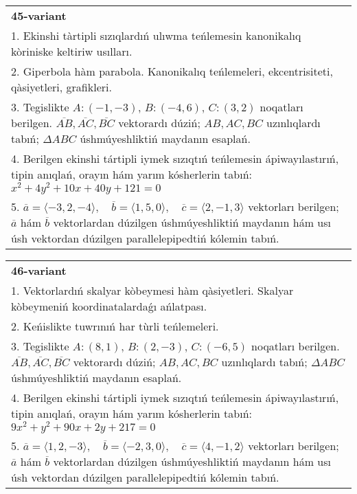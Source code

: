 \documentclass{article}
\begin{document}
\begin{tabular}{m{17cm}}
\textbf{45-variant}\\
1. Ekinshi tàrtipli sızıqlardıń ulıwma teńlemesin kanonikalıq kòriniske keltiriw usılları.\\

2. Giperbola hàm parabola. Kanonikalıq teńlemeleri, ekcentrisiteti, qàsiyetleri, grafikleri.\\

3. Tegislikte $A: (-1, -3)$, $B: (-4, 6)$, $C: (3, 2)$ noqatları berilgen. $\overline{AB}, \overline{AC}, \overline{BC}$ vektorardı dúziń; $AB, AC, BC$ uzınlıqlardı tabıń; $\Delta ABC$ úshmúyeshliktiń maydanın esaplań. \\

4. Berilgen ekinshi tártipli iymek sızıqtıń teńlemesin ápiwayılastırıń, tipin anıqlań, orayın hám yarım kósherlerin tabıń: $x^2+4y^2+10x+40y+121=0$\\

5. \(\overline{a} = \langle -3, 2, -4 \rangle, \quad \overline{b} = \langle 1, 5, 0 \rangle, \quad \overline{c} = \langle 2, -1, 3 \rangle\) vektorları berilgen; \(\overline{a}\) hám \(\overline{b}\) vektorlardan dúzilgen úshmúyeshliktiń maydanın hám usı úsh vektordan dúzilgen parallelepipedtiń kólemin tabıń.
\end{tabular}
\vspace{1cm}


\begin{tabular}{m{17cm}}
\textbf{46-variant}\\
1. Vektorlardıń skalyar kòbeymesi hàm qàsiyetleri. Skalyar kòbeymeniń koordinatalardaǵı ańlatpası.\\

2. Keńislikte tuwrınıń har tùrli teńlemeleri. \\

3. Tegislikte $A: (8, 1)$, $B: (2, -3)$, $C: (-6, 5)$ noqatları berilgen. $\overline{AB}, \overline{AC}, \overline{BC}$ vektorardı dúziń; $AB, AC, BC$ uzınlıqlardı tabıń; $\Delta ABC$ úshmúyeshliktiń maydanın esaplań. \\

4. Berilgen ekinshi tártipli iymek sızıqtıń teńlemesin ápiwayılastırıń, tipin anıqlań, orayın hám yarım kósherlerin tabıń: $9x^2+y^2+90x+2y+217=0$\\

5. \(\overline{a} = \langle 1, 2, -3 \rangle, \quad \overline{b} = \langle -2, 3, 0 \rangle, \quad \overline{c} = \langle 4, -1, 2 \rangle\) vektorları berilgen; \(\overline{a}\) hám \(\overline{b}\) vektorlardan dúzilgen úshmúyeshliktiń maydanın hám usı úsh vektordan dúzilgen parallelepipedtiń kólemin tabıń.
\end{tabular}
\vspace{1cm}
\end{document}
